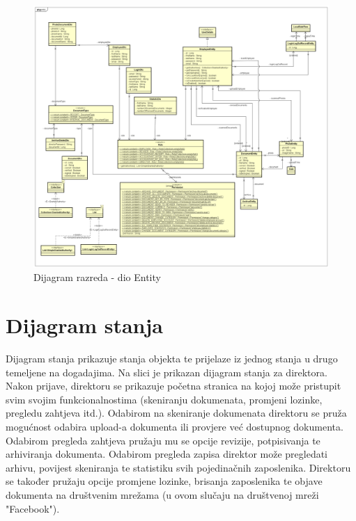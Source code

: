 			\begin{figure}[H]
				\includegraphics[scale=0.3]{slike/EntityDiagram.png} %
				\centering
				\caption{Dijagram razreda - dio Entity}
				\label{fig:promjene}
			\end{figure}
			
			
			
			\eject
		

		\section{Dijagram stanja}
			
			Dijagram stanja prikazuje stanja objekta te prijelaze iz jednog stanja u drugo temeljene na dogadajima. Na slici je prikazan dijagram stanja za direktora. Nakon prijave, direktoru se prikazuje početna stranica na kojoj može pristupit svim svojim funkcionalnostima (skeniranju dokumenata, promjeni lozinke, pregledu zahtjeva itd.). Odabirom na skeniranje dokumenata direktoru se pruža mogućnost odabira upload-a dokumenta ili provjere već dostupnog dokumenta. Odabirom pregleda zahtjeva pružaju mu se opcije revizije, potpisivanja te arhiviranja dokumenta. Odabirom pregleda zapisa direktor može pregledati arhivu, povijest skeniranja te statistiku svih pojedinačnih zaposlenika. Direktoru se također pružaju opcije promjene lozinke, brisanja zaposlenika te objave dokumenta na društvenim mrežama (u ovom slučaju na društvenoj mreži "Facebook").
			
